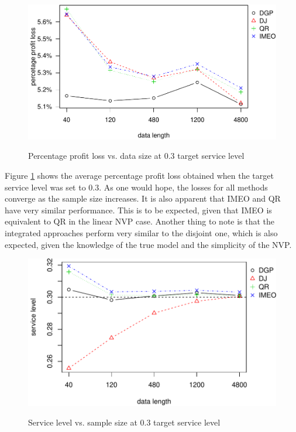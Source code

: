 \documentclass{article}
\begin{document}
\begin{figure}[htb]
\centering
\caption{Percentage profit loss vs. data size at 0.3 target service level}
\includegraphics{ppl0.3.pdf}
\label{fig:ppl0.3}
\end{figure}

Figure \ref{fig:ppl0.3} shows the average percentage profit loss obtained when the target service level was set to $0.3$. As one would hope, the losses for all methods converge as the sample size increases. It is also apparent that IMEO and QR have very similar performance. This is to be expected, given that IMEO is equivalent to QR in the linear NVP case. Another thing to note is that the integrated approaches perform very similar to the disjoint one, which is also expected, given the knowledge of the true model and the simplicity of the NVP.

\begin{figure}[htb]
\centering
\caption{Service level vs. sample size at 0.3 target service level}
\includegraphics{sl0.3.pdf}
\label{fig:sl0.3}
\end{figure}
\end{document}
